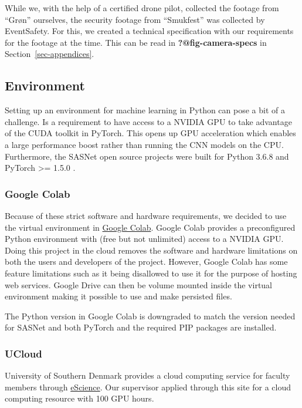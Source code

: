 \documentclass[
]{article}
\begin{document}
While we, with the help of a certified drone pilot, collected the
footage from ``Grøn'' ourselves, the security footage from ``Smukfest''
was collected by EventSafety. For this, we created a technical
specification with our requirements for the footage at the time. This
can be read in \textbf{?@fig-camera-specs} in
Section~\ref{sec-appendices}.

\hypertarget{environment}{%
\subsection{Environment}\label{environment}}

Setting up an environment for machine learning in Python can pose a bit
of a challenge. Is a requirement to have access to a NVIDIA GPU to take
advantage of the CUDA toolkit in PyTorch. This opens up GPU acceleration
which enables a large performance boost rather than running the CNN
models on the CPU. Furthermore, the SASNet open source projects were
built for Python 3.6.8 and PyTorch \textgreater= 1.5.0
\textcite{sasnet}.

\hypertarget{google-colab}{%
\subsubsection{Google Colab}\label{google-colab}}

Because of these strict software and hardware requirements, we decided
to use the virtual environment in
\href{https://research.google.com/colaboratory/faq.html}{Google Colab}.
Google Colab provides a preconfigured Python environment with (free but
not unlimited) access to a NVIDIA GPU. Doing this project in the cloud
removes the software and hardware limitations on both the users and
developers of the project. However, Google Colab has some feature
limitations such as it being disallowed to use it for the purpose of
hosting web services. Google Drive can then be volume mounted inside the
virtual environment making it possible to use and make persisted files.

The Python version in Google Colab is downgraded to match the version
needed for SASNet and both PyTorch and the required PIP packages are
installed.

\hypertarget{ucloud}{%
\subsubsection{UCloud}\label{ucloud}}

University of Southern Denmark provides a cloud computing service for
faculty members through
\href{https://escience.sdu.dk/index.php/national-hpc-systems/}{eScience}.
Our supervisor applied through this site for a cloud computing resource
with 100 GPU hours.
\end{document}

